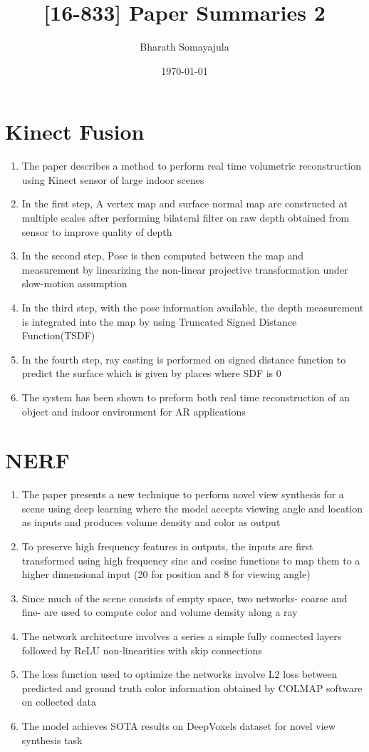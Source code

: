 \documentclass[12pt, a4paper]{article}
\title{[16-833] Paper Summaries 2}
\author{Bharath Somayajula}
\date{\today}
\begin{document}
\maketitle

\tableofcontents
\section{Kinect Fusion}
\begin{enumerate}
  \item The paper describes a method to perform real time volumetric reconstruction using Kinect sensor of large indoor scenes
  \item In the first step, A vertex map and surface normal map are constructed at multiple scales after performing bilateral filter on raw depth obtained from sensor to improve quality of depth
  \item In the second step, Pose is then computed between the map and measurement by linearizing the non-linear projective transformation under slow-motion assumption
  \item In the third step, with the pose information available, the depth measurement is integrated into the map by using Truncated Signed Distance Function(TSDF)
  \item In the fourth step, ray casting is performed on signed distance function to predict the surface which is given by places where SDF is 0
  \item The system has been shown to preform both real time reconstruction of an object and indoor environment for AR applications
\end{enumerate}
\section{NERF}
\begin{enumerate}
  \item The paper presents a new technique to perform novel view synthesis for a scene using deep learning where the model accepts viewing angle and location as inputs and produces volume density and color as output
  \item To preserve high frequency features in outputs, the inputs are first transformed using high frequency sine and cosine functions to map them to a higher dimensional input (20 for position and 8 for viewing angle)
  \item Since much of the scene consists of empty space, two networks- coarse and fine- are used to compute color and volume density along a ray
  \item The network architecture involves a series a simple fully connected layers followed by ReLU non-linearities with skip connections
  \item The loss function used to optimize the networks involve L2 loss between predicted and ground truth color information obtained by COLMAP software on collected data
  \item The model achieves SOTA results on DeepVoxels dataset for novel view synthesis task
\end{enumerate}
\end{document}
